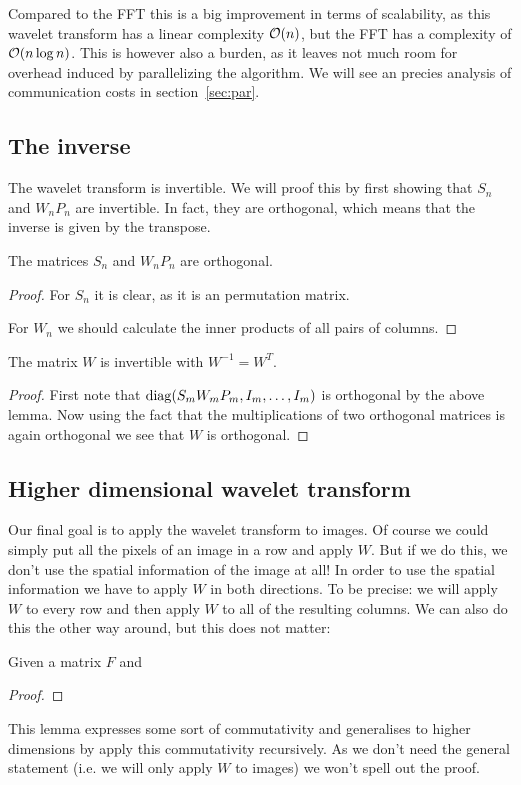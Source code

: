 Compared to the FFT this is a big improvement in terms of scalability, as this wavelet transform has a linear complexity $\mathcal{O}(n)$, but the FFT has a complexity of $\mathcal{O}(n \log n)$. This is however also a burden, as it leaves not much room for overhead induced by parallelizing the algorithm. We will see an precies analysis of communication costs in section~\ref{sec:par}.


\subsection{The inverse}
The wavelet transform is invertible. We will proof this by first showing that $S_n$ and $W_n P_n$ are invertible. In fact, they are orthogonal, which means that the inverse is given by the transpose.

\begin{lemma}
	The matrices $S_n$ and $W_n P_n$ are orthogonal.
\end{lemma}
\begin{proof}
	For $S_n$ it is clear, as it is an permutation matrix.

	For $W_n$ we should calculate the inner products of all pairs of columns.
\end{proof}

\begin{theorem}
	The matrix $W$ is invertible with $W^{-1} = W^T$.
\end{theorem}
\begin{proof}
	First note that $\operatorname{diag}(S_m W_m P_m, I_m, \ldots, I_m)$ is orthogonal by the above lemma. Now using the fact that the multiplications of two orthogonal matrices is again orthogonal we see that $W$ is orthogonal.
\end{proof}



\subsection{Higher dimensional wavelet transform}
Our final goal is to apply the wavelet transform to images. Of course we could simply put all the pixels of an image in a row and apply $W$. But if we do this, we don't use the spatial information of the image at all! In order to use the spatial information we have to apply $W$ in both directions. To be precise: we will apply $W$ to every row and then apply $W$ to all of the resulting columns. We can also do this the other way around, but this does not matter:

\begin{lemma}
	Given a matrix $F$ and 
\end{lemma}
\begin{proof}
\end{proof}

This lemma expresses some sort of commutativity and generalises to higher dimensions by apply this commutativity recursively. As we don't need the general statement (i.e. we will only apply $W$ to images) we won't spell out the proof.